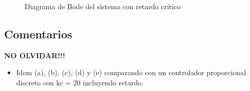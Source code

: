 \begin{figure}[h]
  \centering
  
  \caption{Diagrama de Bode del sistema con retardo crítico}
  \label{fig:bode-g3}
\end{figure}

\FloatBarrier
\subsection{Comentarios}

\textbf{NO OLVIDAR!!!}


\begin{itemize}
  \item Idem (a), (b), (c), (d) y (e) comparando con un controlador proporcional discreto con kc = 20 incluyendo retardo.
\end{itemize}

